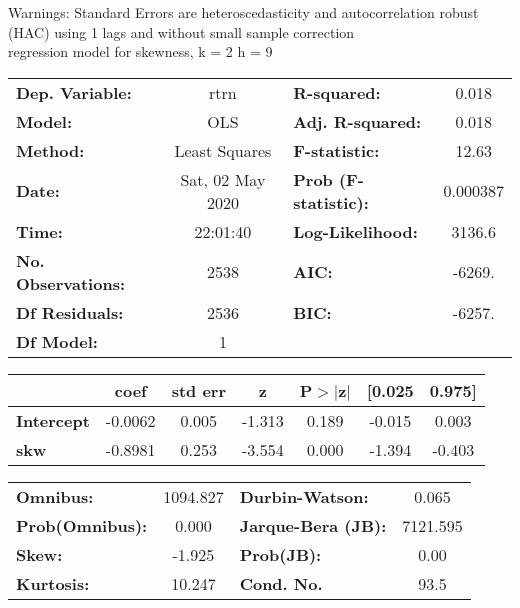 Warnings: \newline
 [1] Standard Errors are heteroscedasticity and autocorrelation robust (HAC) using 1 lags and without small sample correction\\ 

regression model for skewness, k = 2 h = 9\begin{center}
\begin{tabular}{lclc}
\toprule
\textbf{Dep. Variable:}    &       rtrn       & \textbf{  R-squared:         } &     0.018   \\
\textbf{Model:}            &       OLS        & \textbf{  Adj. R-squared:    } &     0.018   \\
\textbf{Method:}           &  Least Squares   & \textbf{  F-statistic:       } &     12.63   \\
\textbf{Date:}             & Sat, 02 May 2020 & \textbf{  Prob (F-statistic):} &  0.000387   \\
\textbf{Time:}             &     22:01:40     & \textbf{  Log-Likelihood:    } &    3136.6   \\
\textbf{No. Observations:} &        2538      & \textbf{  AIC:               } &    -6269.   \\
\textbf{Df Residuals:}     &        2536      & \textbf{  BIC:               } &    -6257.   \\
\textbf{Df Model:}         &           1      & \textbf{                     } &             \\
\bottomrule
\end{tabular}
\begin{tabular}{lcccccc}
                   & \textbf{coef} & \textbf{std err} & \textbf{z} & \textbf{P$> |$z$|$} & \textbf{[0.025} & \textbf{0.975]}  \\
\midrule
\textbf{Intercept} &      -0.0062  &        0.005     &    -1.313  &         0.189        &       -0.015    &        0.003     \\
\textbf{skw}       &      -0.8981  &        0.253     &    -3.554  &         0.000        &       -1.394    &       -0.403     \\
\bottomrule
\end{tabular}
\begin{tabular}{lclc}
\textbf{Omnibus:}       & 1094.827 & \textbf{  Durbin-Watson:     } &    0.065  \\
\textbf{Prob(Omnibus):} &   0.000  & \textbf{  Jarque-Bera (JB):  } & 7121.595  \\
\textbf{Skew:}          &  -1.925  & \textbf{  Prob(JB):          } &     0.00  \\
\textbf{Kurtosis:}      &  10.247  & \textbf{  Cond. No.          } &     93.5  \\
\bottomrule
\end{tabular}
\end{center}

